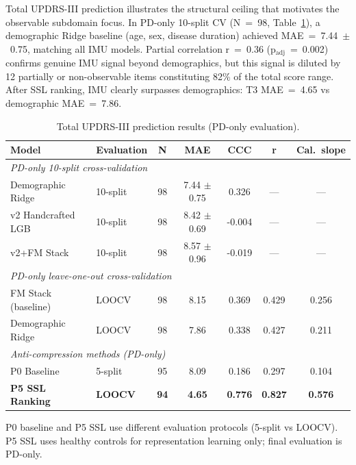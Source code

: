 \documentclass[11pt]{article}
\begin{document}
Total UPDRS-III prediction illustrates the structural ceiling that motivates the observable subdomain focus. In PD-only 10-split CV (N~=~98, Table~\ref{tab:total_updrs}), a demographic Ridge baseline (age, sex, disease duration) achieved MAE~=~7.44~$\pm$~0.75, matching all IMU models. Partial correlation r~=~0.36 (p$_{\text{adj}}$~=~0.002) confirms genuine IMU signal beyond demographics, but this signal is diluted by 12 partially or non-observable items constituting 82\% of the total score range. After SSL ranking, IMU clearly surpasses demographics: T3 MAE~=~4.65 vs demographic MAE~=~7.86.
\begin{table}[H]
\centering
\caption{Total UPDRS-III prediction results (PD-only evaluation).}
\label{tab:total_updrs}
\begin{tabular}{llccccc}
\toprule
Model & Evaluation & N & MAE & CCC & r & Cal.\ slope \\
\midrule
\multicolumn{7}{l}{\textit{PD-only 10-split cross-validation}} \\
Demographic Ridge & 10-split & 98 & 7.44 $\pm$ 0.75 & 0.326 & --- & --- \\
v2 Handcrafted LGB & 10-split & 98 & 8.42 $\pm$ 0.69 & -0.004 & --- & --- \\
v2+FM Stack & 10-split & 98 & 8.57 $\pm$ 0.96 & -0.019 & --- & --- \\
\midrule
\multicolumn{7}{l}{\textit{PD-only leave-one-out cross-validation}} \\
FM Stack (baseline) & LOOCV & 98 & 8.15 & 0.369 & 0.429 & 0.256 \\
Demographic Ridge & LOOCV & 98 & 7.86 & 0.338 & 0.427 & 0.211 \\
\midrule
\multicolumn{7}{l}{\textit{Anti-compression methods (PD-only)}} \\
P0 Baseline & 5-split & 95 & 8.09 & 0.186 & 0.297 & 0.104 \\
\textbf{P5 SSL Ranking} & \textbf{LOOCV} & \textbf{94} & \textbf{4.65} & \textbf{0.776} & \textbf{0.827} & \textbf{0.576} \\
\bottomrule
\end{tabular}

\smallskip
\footnotesize{P0 baseline and P5 SSL use different evaluation protocols (5-split vs LOOCV). P5 SSL uses healthy controls for representation learning only; final evaluation is PD-only.}
\end{table}
\end{document}
